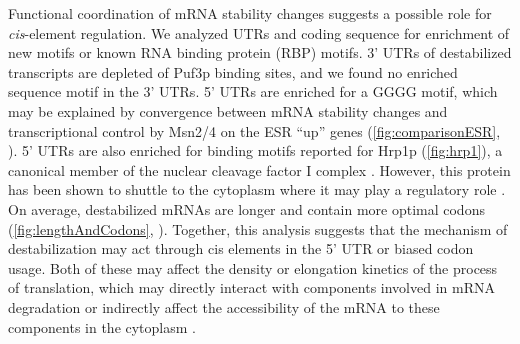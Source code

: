 

Functional coordination of mRNA stability changes suggests  a possible
role for \textit{cis}-element regulation. We analyzed UTRs and coding
sequence for enrichment of new motifs or known RNA binding protein
(RBP) motifs.
3' UTRs of destabilized transcripts are
depleted of Puf3p binding sites, and we found no enriched sequence
motif in the 3' UTRs.
5' UTRs are enriched for a GGGG motif, which
may be explained by convergence between mRNA stability changes and
transcriptional control by Msn2/4 on the ESR “up” genes
(\autoref{fig:comparisonESR},
\cite{gasch2000genomic,canadell2015impact}). 
5' UTRs are also enriched for binding motifs reported for Hrp1p 
(\autoref{fig:hrp1}),
a canonical member of the nuclear cleavage factor I complex
\parencite{chen1998specific}.
However, this protein has been shown to shuttle to the cytoplasm
where it may play a regulatory role
\parencite{kessler1997hrp1,kebaara2003upf,guisbert2005functional}.
On average,
destabilized mRNAs are longer and contain more optimal codons
(\autoref{fig:lengthAndCodons}, \cite{khong2017stress}). 
Together, this analysis suggests that the
mechanism of destabilization may act through cis elements in the 5'
UTR or biased codon usage.
Both of these may affect the density or elongation kinetics of the
process of translation, which may directly interact with components
involved in mRNA degradation or indirectly affect the accessibility
of the mRNA to these components in the cytoplasm \cite{huch2017mrna}.

